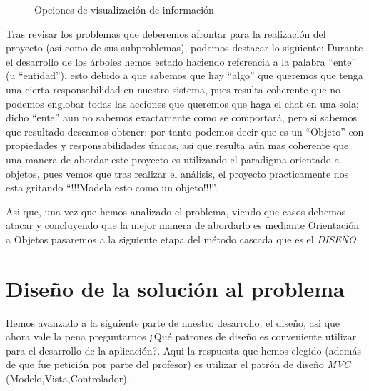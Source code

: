 \documentclass[10pt,letterpaper]{report}
\begin{document}
\vspace{0.5cm} 

\begin{figure}[H]
\centering


\caption{Opciones de visualización de información}
\label{fig:mostrar-informacion}
\end{figure}

\noindent Tras revisar los problemas que deberemos afrontar para la realización del proyecto (así como de sus subproblemas), podemos destacar lo siguiente:
Durante el desarrollo de los árboles hemos estado haciendo referencia a la palabra ``ente'' (u ``entidad''), esto debido a que sabemos que hay ``algo'' que queremos que tenga una cierta responsabilidad en nuestro sistema, pues resulta coherente que no podemos englobar todas las acciones que queremos que haga el chat en una sola; dicho ``ente'' aun no sabemos exactamente como se comportará, pero si sabemos que resultado deseamos obtener; por tanto podemos decir que es un ``Objeto'' con propiedades y responsabilidades únicas, asi que resulta aún mas coherente que una manera de abordar este proyecto es utilizando el paradigma orientado a objetos, pues vemos que tras realizar el análisis, el proyecto practicamente nos esta gritando ``!!!Modela esto como un objeto!!!''.

\vspace{0.2cm}
\noindent Asi que, una vez que hemos analizado el problema, viendo que casos debemos atacar y concluyendo que la mejor manera de abordarlo es mediante Orientación a Objetos pasaremos a la siguiente etapa del método cascada que es el \textit{DISEÑO} 

\chapter{Diseño de la solución al problema}

\noindent Hemos avanzado a la siguiente parte de nuestro desarrollo, el diseño, asi que ahora vale la pena preguntarnos ¿Qué patrones de diseño es conveniente utilizar para el desarrollo de la aplicación?. Aqui la respuesta que hemos elegido (además de que fue petición por parte del profesor) es utilizar el patrón de diseño \textit{MVC} (Modelo,Vista,Controlador).
\end{document}
